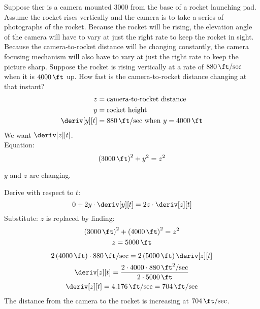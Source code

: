 \begin{example}
    Suppose ther is a camera mounted \SI{3000}{\ft} from the base of a rocket launching pad. Assume the rocket rises vertically and the camera is to take a series of photographs of the rocket. Because the rocket will be rising, the elevation angle of the camera will have to vary at just the right rate to keep the rocket in sight. Because the camera-to-rocket distance will be changing constantly, the camera focusing mechanism will also have to vary at just the right rate to keep the picture sharp. Suppose the rocket is rising vertically at a rate of $\SI{880}{\ft\per\sec}$ when it is $\SI{4000}{\ft}$ up. How fast is the camera-to-rocket distance changing at that instant?
    \begin{align*}
        z &= \text{camera-to-rocket distance} \\
        y &= \text{rocket height} \\
        \deriv[y][t] &= \SI{880}{\ft\per\sec} \text{ when } y = \SI{4000}{\ft}
    \end{align*}
    We want $\deriv[z][t]$. \\
    Equation:
    \begin{equation*}
        \left(\SI{3000}{\ft}\right)^2 + y^2 = z^2
    \end{equation*}
    \begin{note}
        $y$ and $z$ are changing.
    \end{note}
    Derive with respect to $t$:
    \begin{equation*}
        0 + 2y \cdot \deriv[y][t] = 2z \cdot \deriv[z][t]
    \end{equation*}
    Substitute:
    $z$ is replaced by finding:
    \begin{gather*}
        \left(\SI{3000}{\ft}\right)^2 + \left(\SI{4000}{\ft}\right)^2 = z^2 \\
        z = \SI{5000}{\ft}
    \end{gather*}
    \begin{gather*}
        2\left(\SI{4000}{\ft}\right) \cdot \SI{880}{\ft\per\sec} = 2\left(\SI{5000}{\ft}\right)\deriv[z][t] \\
        \deriv[z][t] = \dfrac{2 \cdot 4000 \cdot \SI{880}{\ft\squared\per\sec}}{2 \cdot \SI{5000}{\ft}} \\
        \deriv[z][t] = \SI{4.176}{\ft\per\sec} = \SI{704}{\ft\per\sec}
    \end{gather*}
    The distance from the camera to the rocket is increasing at $\SI{704}{\ft\per\sec}$.
\end{example}
